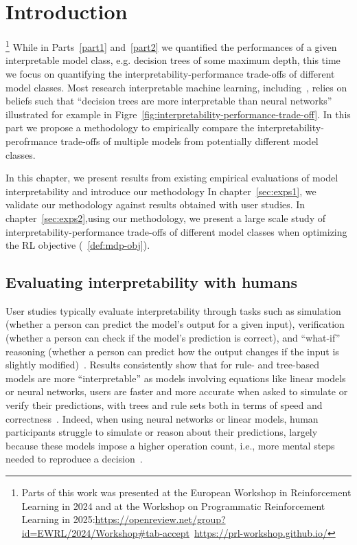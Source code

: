 \chapter{Introduction}\footnote{Parts of this work was presented at the European Workshop in Reinforcement Learning in 2024 and at the Workshop on Programmatic Reinforcement Learning in 2025:\url{https://openreview.net/group?id=EWRL/2024/Workshop#tab-accept}~\url{https://prl-workshop.github.io/}}
While in Parts~\ref{part1} and~\ref{part2} we quantified the performances of a given interpretable model class, e.g. decision trees of some maximum depth, this time we focus on quantifying the interpretability-performance trade-offs of different model classes.
Most research interpretable machine learning, including~\cite{topin2021iterative}, relies on beliefs such that ``decision trees are more interpretable than neural networks'' illustrated for example in Figre~\ref{fig:interpretability-performance-trade-off}.
In this part we propose a methodology to empirically compare the interpretability-perofrmance trade-offs of multiple models from potentially different model classes.

In this chapter, we present results from existing empirical evaluations of model interpretability and introduce our methodology
In chapter~\ref{sec:exps1}, we validate our methodology against results obtained with user studies.
In chapter~\ref{sec:exps2},using our methodology, we present a large scale study of interpretability-performance trade-offs of different model classes when optimizing the RL objective (~\ref{def:mdp-obj}).

\section{Evaluating interpretability with humans}\label{res:humans}
User studies typically evaluate interpretability through tasks such as simulation (whether a person can predict the model’s output for a given input), verification (whether a person can check if the model’s prediction is correct), and “what-if” reasoning (whether a person can predict how the output changes if the input is slightly modified)~\cite{study-6,study-5}.
Results consistently show that for rule- and tree-based models are more ``interpretable'' as models involving equations like linear models or neural networks, users are faster and more accurate when asked to simulate or verify their predictions, with trees and rule sets both in terms of speed and correctness~\citep{study-0,study-1,study-2,study-3,study-7}.
Indeed, when using neural networks or linear models, human participants struggle to simulate or reason about their predictions, largely because these models impose a higher operation count, i.e., more mental steps needed to reproduce a decision~\cite{study-5}.

